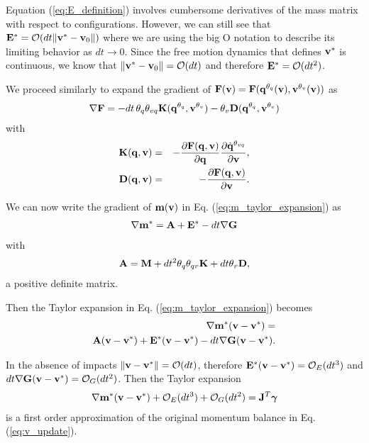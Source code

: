 Equation (\ref{eq:E_definition}) involves cumbersome derivatives of the mass matrix with respect to configurations. However, we can still see that ${\mathbf{E}}^*=\mathcal{O}(dt\Vert{\mathbf{v}}^*-{\mathbf{v}}_0\Vert)$ where we are using the big O notation to describe its limiting behavior as $dt\rightarrow 0$. Since the free motion dynamics that defines ${\mathbf{v}}^*$ is continuous, we know that $\Vert{\mathbf{v}}^*-{\mathbf{v}}_0\Vert = \mathcal{O}(dt)$ and therefore ${\mathbf{E}}^* = \mathcal{O}(dt^2)$.

We proceed similarly to expand the gradient of ${\mathbf{F}}({\mathbf{v}})={\mathbf{F}}({\mathbf{q}}^{\theta_{q}}({\mathbf{v}}), {\mathbf{v}}^{\theta_v}({\mathbf{v}}))$ as
\begin{eqnarray}
	\nabla{\mathbf{F}} =
	-dt\,\theta_q\theta_{vq}{\mathbf{K}}({\mathbf{q}}^{\theta_q}, {\mathbf{v}}^{\theta_v})-\theta_v{\mathbf{D}}({\mathbf{q}}^{\theta_q}, {\mathbf{v}}^{\theta_v})
\end{eqnarray}
with 
\begin{eqnarray}
	\mf{K}(\mf{q}, \mf{v})&=&-\frac{\partial \mf{F}(\mf{q}, \mf{v})}{\partial \mf{q}}\frac{\partial\dot{\mf{q}}^{\theta_{vq}}}{\partial\mf{v}},\\
	\mf{D}(\mf{q}, \mf{v})&=&-\frac{\partial \mf{F}(\mf{q}, \mf{v})}{\partial \mf{v}}.
	\label{eq:dissipation_matrix}
\end{eqnarray}

We can now write the gradient of ${\mathbf{m}}({\mathbf{v}})$ in Eq. (\ref{eq:m_taylor_expansion}) as
\begin{eqnarray}
	\nabla{\mathbf{m}}^* = {\mathbf{A}} + {\mathbf{E}}^* - dt\nabla{\mathbf{G}}
\end{eqnarray}
with 
\begin{eqnarray}
	{\mathbf{A}}={\mathbf{M}}+ dt^2\theta_q\theta_{qv}{\mathbf{K}}+dt\theta_v{\mathbf{D}},
\end{eqnarray}
a positive definite matrix.

Then the Taylor expansion in Eq. (\ref{eq:m_taylor_expansion}) becomes
\begin{eqnarray}
	\nabla{\mathbf{m}}^*({\mathbf{v}}-{\mathbf{v}}^*) =\nonumber\\
	{\mathbf{A}}({\mathbf{v}}-{\mathbf{v}}^*) + {\mathbf{E}}^*({\mathbf{v}}-{\mathbf{v}}^*) - dt\nabla{\mathbf{G}}({\mathbf{v}}-{\mathbf{v}}^*).
\end{eqnarray}

In the absence of impacts $\Vert{\mathbf{v}}-{\mathbf{v}}^*\Vert=\mathcal{O}(dt)$, therefore ${\mathbf{E}}^*({\mathbf{v}}-{\mathbf{v}}^*)=\mathcal{O}_E(dt^3)$ and $dt\nabla{\mathbf{G}}({\mathbf{v}}-{\mathbf{v}}^*)=\mathcal{O}_G(dt^2)$. Then the Taylor expansion
\begin{eqnarray}
	\nabla{\mathbf{m}}^*({\mathbf{v}}-{\mathbf{v}}^*) + \mathcal{O}_E(dt^3) + \mathcal{O}_G(dt^2) = {\mathbf{J}}^T{\mathbf{{\bm\gamma}}}
\end{eqnarray}
is a first order approximation of the original momentum balance in Eq. (\ref{eq:v_update}).

